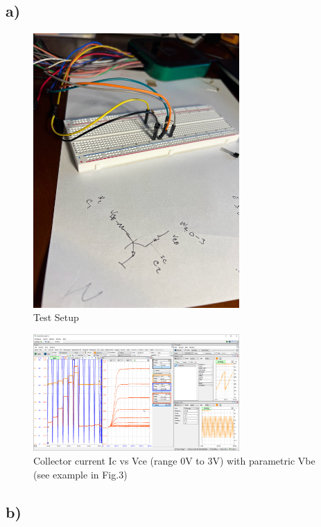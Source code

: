 \documentclass{article}
\begin{document}
	\subsection*{a)}
	
	\begin{figure}[H]
	    \centering
	    \includegraphics[width=0.7\textwidth]{3a-photo}
	    \caption{Test Setup}
	\end{figure}
	
	\begin{figure}[H]
	    \centering
	    \includegraphics[width=0.7\textwidth]{3a}
	    \caption{Collector current Ic vs Vce (range 0V to 3V) with parametric Vbe (see example in Fig.3)}
	\end{figure}
	
	\subsection*{b)}
	
\end{document}
